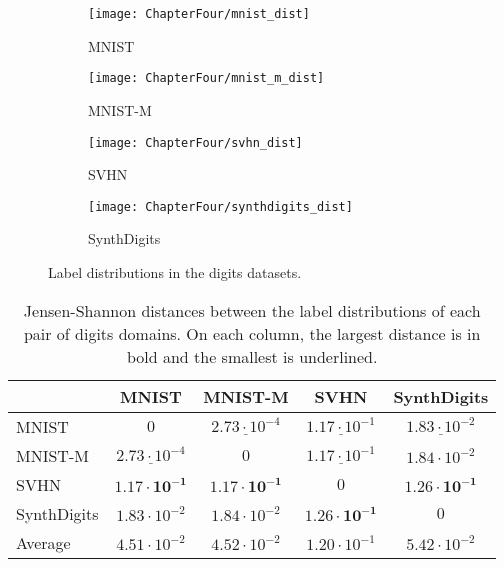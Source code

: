 \begin{figure}
	\centering
	\begin{subfigure}[b]{0.24\textwidth}
		\centering
		\texttt{[image: ChapterFour/mnist\_dist]}
		\caption{MNIST}
	\end{subfigure}
	\hfill
	\begin{subfigure}[b]{0.24\textwidth}
		\centering
		\texttt{[image: ChapterFour/mnist\_m\_dist]}
		\caption{MNIST-M}
	\end{subfigure}
	\hfill
	\begin{subfigure}[b]{0.24\textwidth}
		\centering
		\texttt{[image: ChapterFour/svhn\_dist]}
		\caption{SVHN}
	\end{subfigure}
	\hfill
	\begin{subfigure}[b]{0.24\textwidth}
		\centering
		\texttt{[image: ChapterFour/synthdigits\_dist]}
		\caption{SynthDigits}
	\end{subfigure}
	\caption{Label distributions in the digits datasets.}
	\label{fig:digits_dist}
\end{figure}

\begin{table}
	\centering
	\small
	\begin{tabular}{l|cccc}
		& MNIST                & MNIST-M              & SVHN & SynthDigits \\ \hline
		MNIST       & $0$                  & $\underline{2.73 \cdot 10^{-4}}$ & $\underline{1.17 \cdot 10^{-1}}$     & $\underline{1.83 \cdot 10^{-2}}$            \\
		MNIST-M     & $\underline{2.73 \cdot 10^{-4}}$ & $0$                  & $\underline{1.17 \cdot 10^{-1}}$     & $1.84 \cdot 10^{-2}$            \\
		SVHN        & $\boldsymbol{1.17 \cdot 10^{-1}}$ & $\boldsymbol{1.17 \cdot 10^{-1}}$ & $0$                      & $\boldsymbol{1.26 \cdot 10^{-1}}$            \\
		SynthDigits & $1.83 \cdot 10^{-2}$ & $1.84 \cdot 10^{-2}$ & $\boldsymbol{1.26 \cdot 10^{-1}}$     & $0$ \\ \hline
		Average & $4.51 \cdot 10^{-2}$ &  $4.52 \cdot 10^{-2}$ & $1.20 \cdot 10^{-1}$ & $5.42 \cdot 10^{-2}$
	\end{tabular}
	\caption{Jensen-Shannon distances between the label distributions of each pair of digits domains. On each column, the largest distance is in bold and the smallest is underlined.}
	\label{tab:digits_js}
\end{table}

